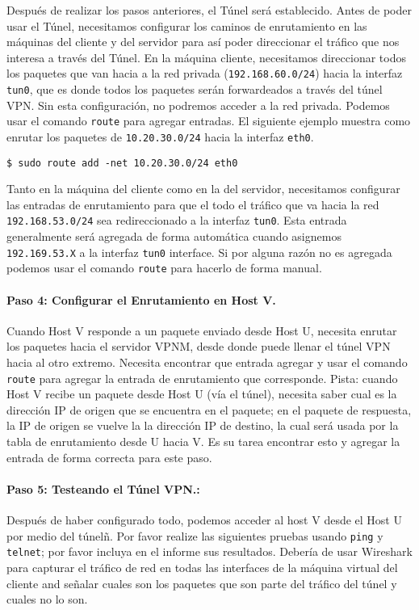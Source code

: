 Después de realizar los pasos anteriores, el Túnel será establecido.
Antes de poder usar el Túnel, necesitamos configurar los caminos de enrutamiento en las máquinas del cliente y del servidor para así poder direccionar el tráfico que nos interesa a través del Túnel.
En la máquina cliente, necesitamos direccionar todos los paquetes que van hacia a la red privada ({\tt 192.168.60.0/24}) hacia la interfaz  \texttt{tun0}, que es donde todos los paquetes serán forwardeados a través del túnel VPN.
Sin esta configuración, no podremos acceder a la red privada.
Podemos usar el comando \texttt{route} para agregar entradas. El siguiente ejemplo muestra como enrutar los paquetes de \texttt{10.20.30.0/24} hacia la interfaz \texttt{eth0}.

\begin{lstlisting}
$ sudo route add -net 10.20.30.0/24 eth0
\end{lstlisting}

Tanto en la máquina del cliente como en la del servidor, necesitamos configurar las entradas de enrutamiento para que el todo el tráfico  que va hacia la red \texttt{192.168.53.0/24} sea redireccionado a la interfaz \texttt{tun0}. Esta entrada generalmente será agregada de forma automática cuando asignemos \texttt{192.169.53.X} a la interfaz \texttt{tun0} interface. Si por alguna razón no es agregada podemos usar el comando \texttt{route} para hacerlo de forma manual.



\paragraph{Paso 4: Configurar el Enrutamiento en Host V.} 
Cuando Host V responde a un paquete enviado desde Host U, necesita enrutar los paquetes hacia el servidor VPNM, desde donde puede llenar el túnel VPN hacia al otro extremo. Necesita encontrar que entrada agregar y usar el comando \texttt{route} para agregar la entrada de enrutamiento que corresponde.
Pista: cuando Host V recibe un paquete desde Host U (vía el túnel), necesita saber cual es la dirección IP de origen que se encuentra en el paquete; en el paquete de respuesta, la IP de origen se vuelve la la dirección IP de destino, la cual será usada por la tabla de enrutamiento desde U hacia V. Es su tarea encontrar esto y agregar la entrada de forma correcta para este paso.

\paragraph{Paso 5: Testeando el Túnel VPN.:} 
Después de haber configurado todo, podemos acceder al host V desde el Host U por medio del túnelñ.
Por favor realize las siguientes pruebas usando \texttt{ping} y \texttt{telnet}; por favor incluya en el informe sus resultados. Debería de usar Wireshark para capturar el tráfico de red en todas las interfaces de la máquina virtual del cliente and señalar cuales son los paquetes que son parte del tráfico del túnel y cuales no lo son.

